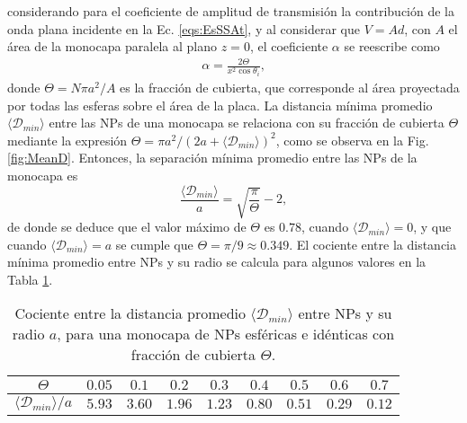 \noindent considerando para el coeficiente de amplitud de transmisión la contribución de la onda plana incidente en la Ec. \eqref{eqs:EsSSAt}, y al considerar que $V = A d$, con $A$ el área de la monocapa paralela al plano $z=0$, el coeficiente $\alpha$ se reescribe como
%
	\begin{align}
	\alpha = \frac{2\Theta}{x^2 \cos\theta_i},
	\label{eq:alpha}
	\end{align}
%
donde $\Theta = N \pi a^2 / A$ es la fracción de cubierta, que corresponde al área proyectada por todas las esferas sobre el área de la placa. La distancia mínima promedio $\langle\mathscr{D}_{min}\rangle$ entre las NPs de una monocapa se relaciona con su fracción de cubierta $\Theta$ mediante la expresión $\Theta = \pi a^2 / (2a+\langle\mathscr{D}_{min}\rangle)^2$, como se observa en la Fig. \ref{fig:MeanD}. Entonces, la separación mínima promedio entre las NPs de la monocapa es
%
	\begin{equation}
	\frac{\langle\mathscr{D}_{min}\rangle}{a} = \sqrt{\frac{\pi}{\Theta}}-2,
	\label{eq:MeanD}
	\end{equation}
%
de donde se deduce que el valor máximo de $\Theta$ es $0.78$, cuando $\langle\mathscr{D}_{min}\rangle=0$, y que cuando $\langle\mathscr{D}_{min}\rangle= a$ se cumple que $\Theta = \pi/9\approx 0.349$. El cociente entre la distancia mínima promedio entre NPs y su radio se calcula para algunos valores en la Tabla  \ref{tab:meanD}.

\begin{table}[h!] \centering
	\caption{Cociente entre la distancia promedio $\langle\mathscr{D}_{min}\rangle$ entre NPs y su radio $a$, para una monocapa de NPs esféricas e idénticas con fracción de cubierta $\Theta$.}
	\label{tab:meanD}\vspace*{-1em}
	\begin{tabular}{c || c c c c c c c c}
	\hline \hline
	$\Theta$ & $0.05$ & $0.1$ & $0.2$ & $0.3$ & $0.4$ & $0.5$ & $0.6$ & $0.7$\\
 \hline 
	$\langle\mathscr{D}_{min}\rangle / a $& $5.93$ & $3.60$ & $1.96$ & $1.23$ & $0.80$ & $0.51$ & $0.29$ & $0.12$ \\
	\hline \hline
	\end{tabular} 
\end{table}

